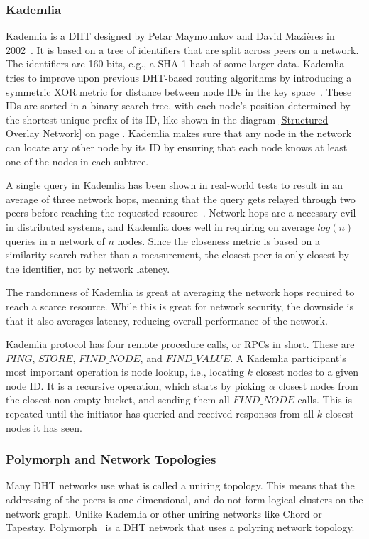 \subsubsection{Kademlia}
Kademlia is a DHT designed by Petar Maymounkov and David Mazières in 2002~\cite{Petar_Maymounkov2020}. It is based on a tree of identifiers that are split across peers on a network. The identifiers are 160 bits, e.g., a SHA-1 hash of some larger data. Kademlia tries to improve upon previous DHT-based routing algorithms by introducing a symmetric XOR metric for distance between node IDs in the key space~\cite{Petar_Maymounkov2020-sx}. These IDs are sorted in a binary search tree, with each node's position determined by the shortest unique prefix of its ID, like shown in the diagram \ref{Structured Overlay Network} on page \pageref{Structured Overlay Network}. Kademlia makes sure that any node in the network can locate any other node by its ID by ensuring that each node knows at least one of the nodes in each subtree.

A single query in Kademlia has been shown in real-world tests to result in an average of three network hops, meaning that the query gets relayed through two peers before reaching the requested resource~\cite{Roos2013-mb}. Network hops are a necessary evil in distributed systems, and Kademlia does well in requiring on average \(log(n)\) queries in a network of \(n\) nodes. Since the closeness metric is based on a similarity search rather than a measurement, the closest peer is only closest by the identifier, not by network latency.~\cite{Eigenmann2020-zm}

The randomness of Kademlia is great at averaging the network hops required to reach a scarce resource. While this is great for network security, the downside is that it also averages latency, reducing overall performance of the network.

Kademlia protocol has four remote procedure calls, or RPCs in short. These are \(\mathit{PING}\), \(\mathit{STORE}\), \(\mathit{FIND\_NODE}\), and \(\mathit{FIND\_VALUE}\). A Kademlia participant's most important operation is node lookup, i.e., locating \(k\) closest nodes to a given node ID. It is a recursive operation, which starts by picking \(\alpha\) closest nodes from the closest non-empty bucket, and sending them all \(\mathit{FIND\_NODE}\) calls. This is repeated until the initiator has queried and received responses from all \(k\) closest nodes it has seen.

\subsubsection{Polymorph and Network Topologies}
Many DHT networks use what is called a uniring topology. This means that the addressing of the peers is one-dimensional, and do not form logical clusters on the network graph. Unlike Kademlia or other uniring networks like Chord or Tapestry, Polymorph~\cite{Jenkov_undated-kl} is a DHT network that uses a polyring network topology.


